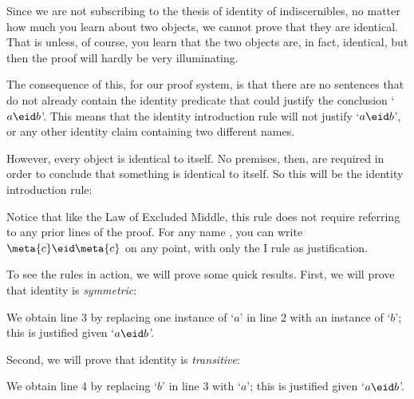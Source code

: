 Since we are not subscribing to the thesis of identity of indiscernibles, no matter how much you learn about two objects, we cannot prove that they are identical. That is unless, of course, you learn that the two objects are, in fact, identical, but then the proof will hardly be very illuminating.

The consequence of this, for our proof system, is that there are no sentences that do not already contain the identity predicate that could justify the conclusion `$a\eid b$'. This means that the identity introduction rule will not justify `$a\eid b$', or any other identity claim containing two different names.

However, every object is identical to itself. No premises, then, are required in order to conclude that something is identical to itself. So this will be the identity introduction rule:
\begin{highlighted}
\begin{fitchproof}
	 
\end{fitchproof}\end{highlighted}
Notice that like the Law of Excluded Middle, this rule does not require referring to any prior lines of the proof. For any name , you can write $\meta{c}\eid \meta{c}$ on any point, with only the {\eid }I rule as justification.


To see the rules in action, we will prove some quick results. First, we will prove that identity is \emph{symmetric}:
\begin{fitchproof}
	\open
	\close
\end{fitchproof}
We obtain line 3 by replacing one instance of `$a$' in line 2 with an instance of `$b$'; this is justified given `$a\eid  b$'.

Second, we will prove that identity is \emph{transitive}:
\begin{fitchproof}
	\open
	\close
\end{fitchproof}
We obtain line 4 by replacing `$b$' in line 3 with `$a$'; this is justified given `$a\eid  b$'.

